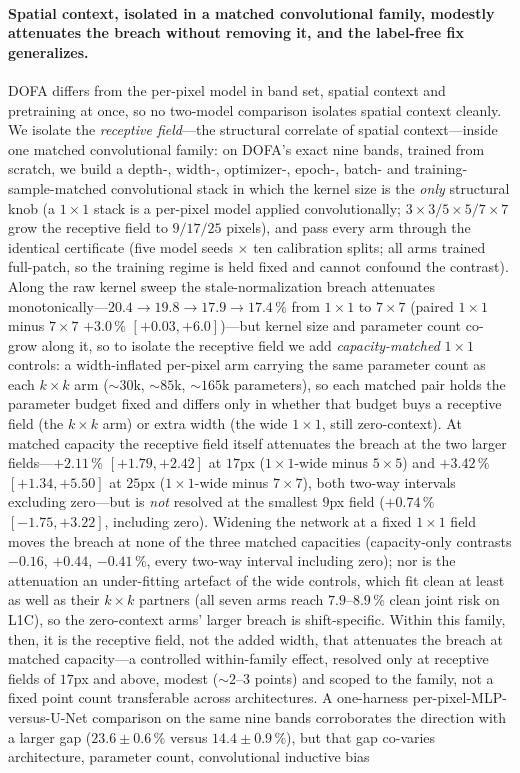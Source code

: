 \documentclass[preprint,3p,times]{elsarticle}
\begin{document}
\paragraph{Spatial context, isolated in a matched convolutional family, modestly attenuates the breach without removing it, and the label-free fix generalizes.} DOFA differs from the per-pixel model in band set, spatial context and pretraining at once, so no two-model comparison isolates spatial context cleanly. We isolate the \emph{receptive field}---the structural correlate of spatial context---inside one matched convolutional family: on DOFA's exact nine bands, trained from scratch, we build a depth-, width-, optimizer-, epoch-, batch- and training-sample-matched convolutional stack in which the kernel size is the \emph{only} structural knob (a $1\times1$ stack is a per-pixel model applied convolutionally; $3\times3/5\times5/7\times7$ grow the receptive field to $9/17/25$ pixels), and pass every arm through the identical certificate (five model seeds $\times$ ten calibration splits; all arms trained full-patch, so the training regime is held fixed and cannot confound the contrast). Along the raw kernel sweep the stale-normalization breach attenuates monotonically---$20.4 \to 19.8 \to 17.9 \to 17.4\,\%$ from $1\times1$ to $7\times7$ (paired $1\times1$ minus $7\times7$ $+3.0\,\%$ $[+0.03,+6.0]$)---but kernel size and parameter count co-grow along it, so to isolate the receptive field we add \emph{capacity-matched} $1\times1$ controls: a width-inflated per-pixel arm carrying the same parameter count as each $k\times k$ arm (${\sim}30$k, ${\sim}85$k, ${\sim}165$k parameters), so each matched pair holds the parameter budget fixed and differs only in whether that budget buys a receptive field (the $k\times k$ arm) or extra width (the wide $1\times1$, still zero-context). At matched capacity the receptive field itself attenuates the breach at the two larger fields---$+2.11\,\%$ $[+1.79,+2.42]$ at $17$px ($1\times1$-wide minus $5\times5$) and $+3.42\,\%$ $[+1.34,+5.50]$ at $25$px ($1\times1$-wide minus $7\times7$), both two-way intervals excluding zero---but is \emph{not} resolved at the smallest $9$px field ($+0.74\,\%$ $[-1.75,+3.22]$, including zero). Widening the network at a fixed $1\times1$ field moves the breach at none of the three matched capacities (capacity-only contrasts $-0.16$, $+0.44$, $-0.41\,\%$, every two-way interval including zero); nor is the attenuation an under-fitting artefact of the wide controls, which fit clean at least as well as their $k\times k$ partners (all seven arms reach $7.9$--$8.9\,\%$ clean joint risk on L1C), so the zero-context arms' larger breach is shift-specific. Within this family, then, it is the receptive field, not the added width, that attenuates the breach at matched capacity---a controlled within-family effect, resolved only at receptive fields of $17$px and above, modest (${\sim}2$--$3$ points) and scoped to the family, not a fixed point count transferable across architectures. A one-harness per-pixel-MLP-versus-U-Net comparison on the same nine bands corroborates the direction with a larger gap ($23.6 \pm 0.6\,\%$ versus $14.4 \pm 0.9\,\%$), but that gap co-varies architecture, parameter count, convolutional inductive bias 
\end{document}
